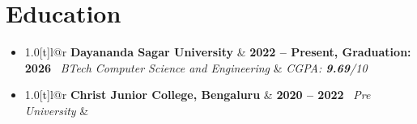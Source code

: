 \documentclass[a4paper]{extarticle}
\makeatletter
\newcommand{\resumeSubheading}[4]{
  \vspace{-2pt}\item
    \begin{tabular*}{1.0\textwidth}[t]{l@{\extracolsep{\fill}}r}
      \textbf{#1} & \textbf{\small #2} \
      \textit{\small#3} & \textit{\small #4} \
    \end{tabular*}\vspace{-7pt}
}
\newcommand{\resumeSubHeadingListStart}{\begin{itemize}[leftmargin=0.0in, label={}]}
\newcommand{\resumeSubHeadingListEnd}{\end{itemize}}
\makeatother
\begin{document}

\vspace{-13 pt}    
\section{Education}
  \resumeSubHeadingListStart
    \resumeSubheading
      {Dayananda Sagar University}{2022 -- Present, Graduation: 2026}
      {BTech Computer Science and Engineering}{CGPA: \textbf{9.69}/10}
    \resumeSubheading
      {Christ Junior College, Bengaluru}{2020 -- 2022}
      {Pre University}{}
  \resumeSubHeadingListEnd
 
\end{document}
